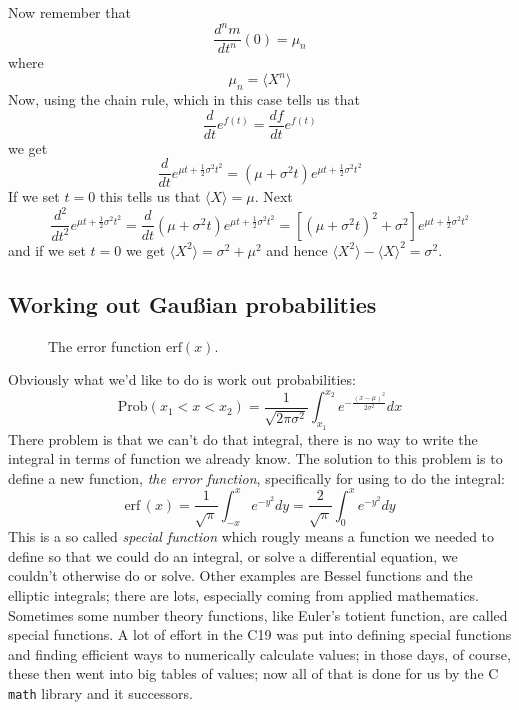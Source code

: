 \documentclass[11pt,a4paper]{scrartcl}
\begin{document}
Now remember that 
\begin{equation}
\frac{d^nm}{dt^n}(0)=\mu_n
\end{equation}
where 
\begin{equation}
\mu_n=\langle X^n\rangle
\end{equation}
Now, using the chain rule, which in this case tells us that
\begin{equation}
\frac{d}{dt}e^{f(t)}=\frac{df}{dt}e^{f(t)}
\end{equation}
we get
\begin{equation}
\frac{d}{dt}e^{\mu t + \frac{1}{2}\sigma^2 t^2}=(\mu+\sigma^2 t)e^{\mu t + \frac{1}{2}\sigma^2 t^2}
\end{equation}
If we set $t=0$ this tells us that $\langle X\rangle =\mu$. Next
 \begin{equation}
\frac{d^2}{dt^2}e^{\mu t + \frac{1}{2}\sigma^2 t^2}=\frac{d}{dt}(\mu+\sigma^2 t)e^{\mu t + \frac{1}{2}\sigma^2 t^2}=[(\mu+\sigma^2 t)^2+\sigma^2]e^{\mu t + \frac{1}{2}\sigma^2 t^2}
\end{equation}
and if we set $t=0$ we get $\langle X^2\rangle =\sigma^2+\mu^2$ and
hence $\langle X^2\rangle-\langle X\rangle^2=\sigma^2$.

\subsection*{Working out Gau\ss{}ian probabilities}


\begin{figure}[tb]
\begin{center}

\end{center}
\caption{The error function $\mbox{erf}(x)$.\label{fig_erf}}
\end{figure}


Obviously what we'd like to do is work out probabilities:
\begin{equation}
\mbox{Prob}(x_1<x<x_2)=\frac{1}{\sqrt{2\pi\sigma^2}}\int_{x_1}^{x_2} e^{-\frac{(x-\mu)^2}{2\sigma^2}}dx
\end{equation}
There problem is that we can't do that integral, there is no way to
write the integral in terms of function we already know. The solution
to this problem is to define a new function, \textsl{the error
  function}, specifically for using to do the integral:
\begin{equation}
\mbox{erf}\,(x)=\frac{1}{\sqrt{\pi}}\int_{-x}^xe^{-y^2}dy=\frac{2}{\sqrt{\pi}}\int_0^xe^{-y^2}dy
\end{equation}
This is a so called \textsl{special function} which rougly means a
function we needed to define so that we could do an integral, or solve
a differential equation, we couldn't otherwise do or solve. Other
examples are Bessel functions and the elliptic integrals; there are
lots, especially coming from applied mathematics. Sometimes some
number theory functions, like Euler's totient function, are called
special functions. A lot of effort in the C19 was put into defining
special functions and finding efficient ways to numerically calculate
values; in those days, of course, these then went into big tables of
values; now all of that is done for us by the C \texttt{math} library
and it successors.
\end{document}
